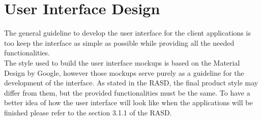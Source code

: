 \chapter{User Interface Design}\label{c:gui}
The general guideline to develop the user interface for the client applications is too keep the interface as simple as possible while providing all the needed functionalities.\\
The style used to build the user interface mockups is based on the Material Design by Google, however those mockups serve purely as a guideline for the development of the interface. As stated in the RASD, the final product style may differ from them, but the provided functionalities must be the same.
To have a better idea of how the user interface will look like when the applications will be finished please refer to the section 3.1.1 of the RASD.